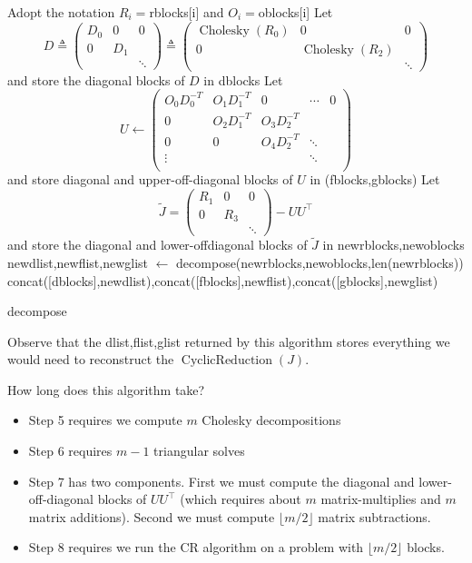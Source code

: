 \documentclass{article}
\theoremstyle{definition}
\DeclareMathOperator{\CyclicReduction}{CyclicReduction}
\DeclareMathOperator{\chol}{Cholesky}
\begin{document}
\begin{algorithm}[H]
 \eIf{$m=1$}{
    \Return $[\chol(R_0)],[],[]$
 }
 {
    Adopt the notation $R_i=$rblocks[i] and $O_i=$oblocks[i]\;
    Let
    \[
    D \triangleq  \left(\begin{array}{ccc}
    D_0 & 0 & 0\\
    0 & D_1 \\
     &  & \ddots
    \end{array}\right) 
    \triangleq \left(\begin{array}{ccc}
    \chol\left(R_{0}\right) & 0 & 0\\
    0 & \chol\left(R_{2}\right)\\
     &  & \ddots
    \end{array}\right)
    \]
    and store the diagonal blocks of $D$ in dblocks\;
    Let
    \[
    U \gets \left(\begin{array}{ccccc}
    O_{0}D_{0}^{-T} & O_{1}D_{1}^{-T} & 0 & \cdots & 0\\
    0 & O_{2}D_{1}^{-T} & O_{3}D_{2}^{-T}\\
    0 & 0 & O_{4}D_{2}^{-T} & \ddots\\
    \vdots &  &  & \ddots & \\
    \end{array}\right)
    \]
    and store diagonal and upper-off-diagonal blocks of $U$ in (fblocks,gblocks)\;
    Let
    \[
    \tilde J = \left(\begin{array}{ccc}
    R_1 & 0 & 0\\
    0 & R_3\\
     &  & \ddots
    \end{array}\right) - UU^\top
    \]
    and store the diagonal and lower-offdiagonal blocks of $\tilde J$ in newrblocks,newoblocks\;
    newdlist,newflist,newglist $\gets$ decompose(newrblocks,newoblocks,len(newrblocks))\; 
    \Return concat([dblocks],newdlist),concat([fblocks],newflist),concat([gblocks],newglist)\;
 }
 \caption{decompose}
\end{algorithm}

Observe that the dlist,flist,glist returned by this algorithm stores everything we would need to reconstruct the $\CyclicReduction(J)$.

How long does this algorithm take?
\begin{itemize}
    \item Step 5 requires we compute $m$ Cholesky decompositions
    \item Step 6 requires $m-1$ triangular solves
    \item Step 7 has two components.  First we must compute the diagonal and lower-off-diagonal blocks of $UU^\top$ (which requires about $m$ matrix-multiplies and $m$ matrix additions).  Second we must compute $\lfloor m/2 \rfloor$ matrix subtractions.
    \item Step 8 requires we run the CR algorithm on a problem with $\lfloor m/2 \rfloor$ blocks.
\end{itemize}
\end{document}
